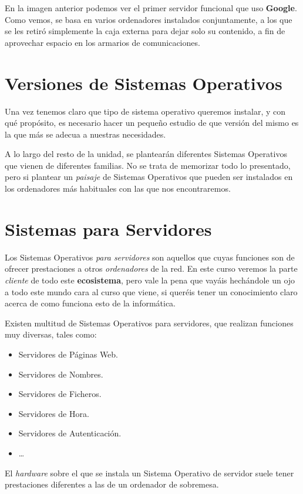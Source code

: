 \documentclass[11pt]{article}
\begin{document}
En la imagen anterior podemos ver el primer servidor funcional que uso
\textbf{Google}. Como vemos, se basa en varios ordenadores instalados
conjuntamente, a los que se les retiró simplemente la caja externa para
dejar solo su contenido, a fin de aprovechar espacio en los armarios de
comunicaciones.

\section{Versiones de Sistemas Operativos}
\label{sec:org6ea0588}
Una vez tenemos claro que tipo de sistema operativo queremos instalar, y
con qué propósito, es necesario hacer un pequeño estudio de que versión
del mismo es la que más se adecua a nuestras necesidades.

A lo largo del resto de la unidad, se plantearán diferentes Sistemas Operativos
que vienen de diferentes familias. No se trata de memorizar todo lo presentado,
pero si plantear un \emph{paisaje} de Sistemas Operativos que pueden ser instalados
en los ordenadores más habituales con las que nos encontraremos.

\section{Sistemas para Servidores}
\label{sec:org8c6fa8d}
Los Sistemas Operativos \emph{para servidores} son aquellos que cuyas funciones son 
de ofrecer prestaciones a otros \emph{ordenadores} de la red. En este curso veremos 
la parte \emph{cliente} de todo este \textbf{ecosistema}, pero vale la pena que vayáis hechándole
un ojo a todo este mundo cara al curso que viene, si queréis tener un conocimiento
claro acerca de como funciona esto de la informática.

Existen multitud de Sistemas Operativos para servidores, que realizan funciones muy diversas, 
tales como:

\begin{itemize}
\item Servidores de Páginas Web.
\item Servidores de Nombres.
\item Servidores de Ficheros.
\item Servidores de Hora.
\item Servidores de Autenticación.
\item \ldots{}
\end{itemize}

El \emph{hardware} sobre el que se instala un Sistema Operativo de servidor
suele tener prestaciones diferentes a las de un ordenador de sobremesa.
\end{document}
